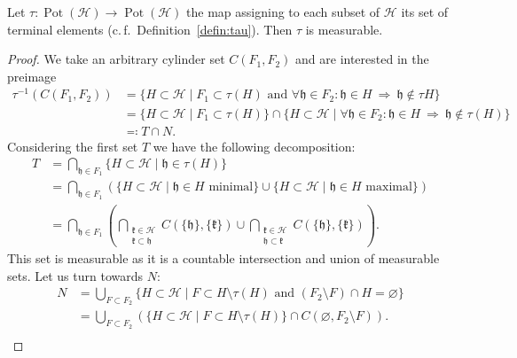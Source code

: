 \begin{lemma}
  \label{lem:tau}
   Let \(\tau\colon \operatorname{Pot}(\mathcal{H}) \to \operatorname{Pot}(\mathcal{H})\) the map assigning to each subset of \(\mathcal{H}\) its set of terminal elements (c.\,f.~Definition~\ref{defin:tau}). Then \(\tau\) is measurable.
\end{lemma}

\begin{proof}
  We take an arbitrary cylinder set \(C(F_1, F_2)\) and are interested in the preimage
  \begin{align*}
    \tau^{-1}(C(F_1, F_2))
    & = \{H \subset \mathcal{H} \mid F_1 \subset \tau(H) \text{ and } \forall \mathfrak{h} \in F_2\colon \mathfrak{h} \in H\ \Rightarrow\ \mathfrak{h} \not\in \tau{H}\} \\
    & = \{H \subset \mathcal{H} \mid F_1 \subset \tau(H)\} \cap \{H \subset \mathcal{H} \mid \forall \mathfrak{h} \in F_2\colon \mathfrak{h} \in H\ \Rightarrow\ \mathfrak{h} \not\in \tau(H)\}\\
    & \eqqcolon T \cap N.
  \end{align*}
  Considering the first set \(T\) we have the following decomposition:
  \begin{align*}
    T
    & = \bigcap_{\mathfrak{h} \in F_1}\{H \subset \mathcal{H} \mid \mathfrak{h} \in \tau(H)\}\\
    & = \bigcap_{\mathfrak{h} \in F_1}\left (\{H \subset \mathcal{H} \mid \mathfrak{h} \in H \text{ minimal}\} \cup \{H \subset \mathcal{H} \mid \mathfrak{h} \in H \text{ maximal}\}\right )\\
    & = \bigcap_{\mathfrak{h} \in F_1}\left ( \bigcap_{\substack{\mathfrak{k} \in \mathcal{H}\\\mathfrak{k} \subset \mathfrak{h}}}C(\{\mathfrak{h}\}, \{\mathfrak{k}\}) \cup \bigcap_{\substack{\mathfrak{k} \in \mathcal{H}\\\mathfrak{h} \subset\mathfrak{k}}} C(\{\mathfrak{h}\}, \{\mathfrak{k}\})\right ).
  \end{align*}
  This set is measurable as it is a countable intersection and union of measurable sets. Let us turn towards \(N\):
  \begin{align*}
    N
    & = \bigcup_{F \subset F_2} \{H \subset \mathcal{H} \mid F \subset H \setminus \tau(H) \text{ and } (F_2 \setminus F) \cap H = \varnothing\}\\
    & = \bigcup_{F \subset F_2} \left ( \{H \subset \mathcal{H} \mid F \subset H \setminus \tau(H)\} \cap C(\varnothing, F_2 \setminus F)\right).\\

\end{align*}
\end{proof}

